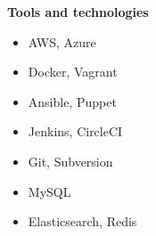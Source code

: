 \begin{minipage}[t]{.3\linewidth}
\vspace{0pt}
\textbf{Tools and technologies}
\begin{itemize}[itemsep=0pt]
    \item[] \hspace*{-1em} AWS, Azure
    \item[] \hspace*{-1em} Docker, Vagrant
    \item[] \hspace*{-1em} Ansible, Puppet
    \item[] \hspace*{-1em} Jenkins, CircleCI
    \item[] \hspace*{-1em} Git, Subversion
    \item[] \hspace*{-1em} MySQL %
    \item[] \hspace*{-1em} Elasticsearch, Redis
\end{itemize}
\end{minipage}
